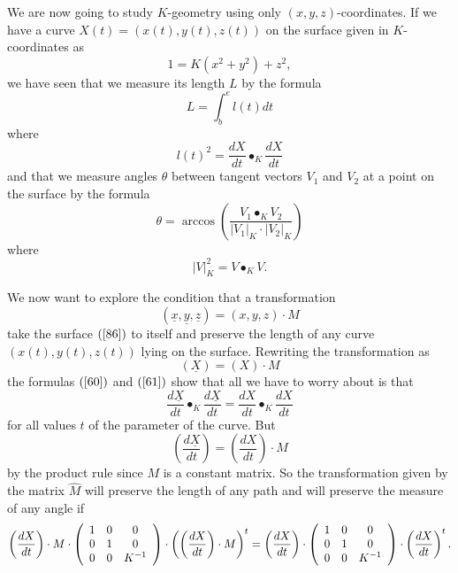 \documentclass{ximera}
\begin{document}
We are now going to study $K$-geometry using only $\left(  x,y,z\right)
$-coordinates. If we have a curve $X\left(  t\right)  =\left(  x\left(
t\right)  ,y\left(  t\right)  ,z\left(  t\right)  \right)  $ on the surface
given in $K$-coordinates as%
\begin{equation}
1=K\left(  x^{2}+y^{2}\right)  +z^{2}, \label{86}%
\end{equation}
we have seen that we measure its length $L$ by the formula%
\begin{equation}
L=%
{\displaystyle\int\nolimits_{b}^{e}}
l\left(  t\right)  dt \label{60}%
\end{equation}
where
\begin{equation}
l\left(  t\right)  ^{2}=\frac{dX}{dt}\bullet_{K}\frac{dX}{dt} \label{61}%
\end{equation}
and that we measure angles $\theta$ between tangent vectors $V_{1}$ and
$V_{2}$ at a point on the surface by the formula%
\[
\theta=\arccos\left(  \frac{V_{1}\bullet_{K}V_{2}}{\left\vert
V_{1}\right\vert _{K}\cdot\left\vert V_{2}\right\vert
_{K}}\right)
\]
where%
\[
\left\vert V\right\vert _{K}^{2}=V\bullet_{K}V.
\]


We now want to explore the condition that a transformation%
\[
\left(  \underline{x},\underline{y},\underline{z}\right)  =\left(
x,y,z\right)  \cdot M
\]
take the surface $\left(  \ref{86}\right)  $ to itself and preserve the length
of any curve $\left(  x\left(  t\right)  ,y\left(  t\right)  ,z\left(
t\right)  \right)  $ lying on the surface. Rewriting the transformation as%
\[
\left(  \underline{X}\right)  =\left(  X\right)  \cdot M
\]
the formulas $\left(  \ref{60}\right)  $ and $\left(  \ref{61}\right)  $ show
that all we have to worry about is that%
\[
\frac{d\underline{X}}{dt}\bullet_{K}\frac{d\underline{X}}{dt}=\frac{dX}%
{dt}\bullet_{K}\frac{dX}{dt}%
\]
for all values $t$ of the parameter of the curve. But%
\[
\left(  \frac{d\underline{X}}{dt}\right)  =\left(  \frac{dX}{dt}\right)  \cdot
M
\]
by the product rule since $M$ is a constant matrix. So the transformation
given by the matrix $\hat{M}$ will preserve the length of any path and will
preserve the measure of any angle if%
\begin{equation}
\left(  \frac{dX}{dt}\right)  \cdot M\cdot\left(
\begin{array}
[c]{ccc}%
1 & 0 & 0\\
0 & 1 & 0\\
0 & 0 & K^{-1}%
\end{array}
\right)  \cdot\left(  \left(  \frac{dX}{dt}\right)  \cdot M\right)
^{t}=\left(  \frac{dX}{dt}\right)  \cdot\left(
\begin{array}
[c]{ccc}%
1 & 0 & 0\\
0 & 1 & 0\\
0 & 0 & K^{-1}%
\end{array}
\right)  \cdot\left(  \frac{dX}{dt}\right)  ^{t}. \label{89}%
\end{equation}
\end{document}
